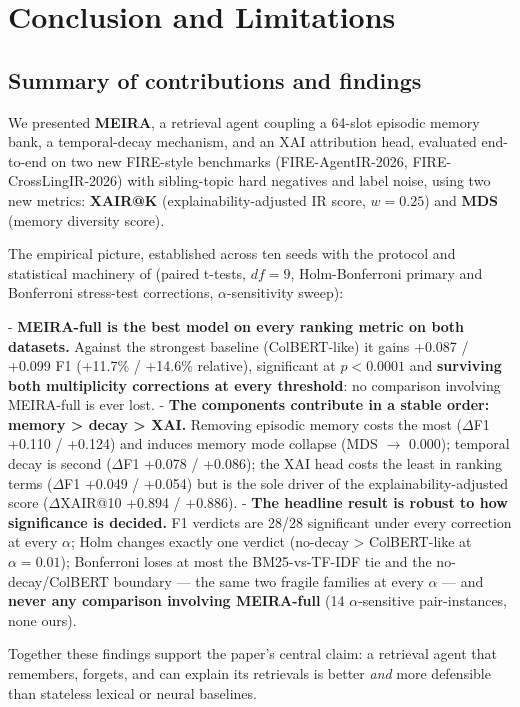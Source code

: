 \section{Conclusion and Limitations}
\label{sec:concl}

\subsection{Summary of contributions and findings}
\label{sec:concl-summary}

We presented \textbf{MEIRA}, a retrieval agent coupling a 64-slot episodic memory bank, a temporal-decay mechanism, and an XAI attribution head, evaluated end-to-end on two new FIRE-style benchmarks (FIRE-AgentIR-2026, FIRE-CrossLingIR-2026) with sibling-topic hard negatives and label noise, using two new metrics: \textbf{XAIR@K} (explainability-adjusted IR score, $w = 0.25$) and \textbf{MDS} (memory diversity score).

The empirical picture, established across ten seeds with the protocol and statistical machinery of  (paired t-tests, $df = 9$, Holm-Bonferroni primary and Bonferroni stress-test corrections, $\alpha$-sensitivity sweep):

- \textbf{MEIRA-full is the best model on every ranking metric on both datasets.} Against the strongest baseline (ColBERT-like) it gains +0.087 / +0.099 F1 (+11.7\% / +14.6\% relative), significant at $p < 0.0001$ and \textbf{surviving both multiplicity corrections at every threshold}: no comparison involving MEIRA-full is ever lost. - \textbf{The components contribute in a stable order: memory > decay > XAI.} Removing episodic memory costs the most ($\Delta$F1 +0.110 / +0.124) and induces memory mode collapse (MDS $\rightarrow$ 0.000); temporal decay is second ($\Delta$F1 +0.078 / +0.086); the XAI head costs the least in ranking terms ($\Delta$F1 +0.049 / +0.054) but is the sole driver of the explainability-adjusted score ($\Delta$XAIR@10 +0.894 / +0.886). - \textbf{The headline result is robust to how significance is decided.} F1 verdicts are 28/28 significant under every correction at every $\alpha$; Holm changes exactly one verdict (no-decay > ColBERT-like at $\alpha = 0.01$); Bonferroni loses at most the BM25-vs-TF-IDF tie and the no-decay/ColBERT boundary --- the same two fragile families at every $\alpha$ --- and \textbf{never any comparison involving MEIRA-full} (14 $\alpha$-sensitive pair-instances, none ours).

Together these findings support the paper's central claim: a retrieval agent that remembers, forgets, and can explain its retrievals is better \emph{and} more defensible than stateless lexical or neural baselines.

